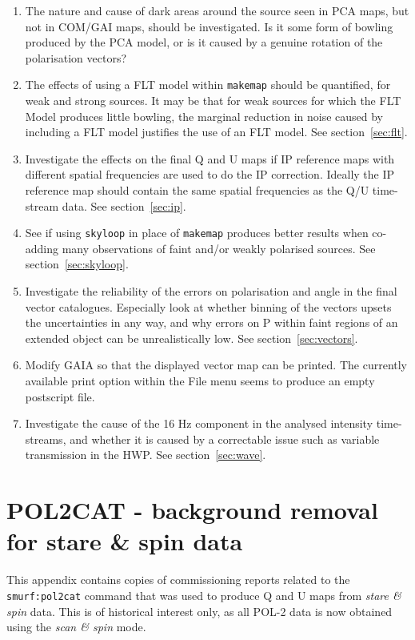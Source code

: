 \documentclass[twoside,11pt]{starlink}
\begin{document}
\begin{enumerate}
\item The nature and cause of dark areas around the source seen in PCA
maps, but not in COM/GAI maps, should be investigated. Is it some form of
bowling produced by the PCA model, or is it caused by a genuine rotation
of the polarisation vectors?

\item The effects of using a FLT model within \texttt{makemap} should be
quantified, for weak and strong sources. It may be that for weak sources
for which the FLT Model produces little bowling, the marginal reduction
in noise caused by including a FLT model justifies the use of an FLT model.
See section~\ref{sec:flt}.

\item Investigate the effects on the final Q and U maps if IP reference
maps with different spatial frequencies are used to do the IP correction.
Ideally the IP reference map should contain the same spatial frequencies
as the Q/U time-stream data. See section~\ref{sec:ip}.

\item See if using \texttt{skyloop} in place of \texttt{makemap} produces
better results when co-adding many observations of faint and/or weakly
polarised sources.  See section~\ref{sec:skyloop}.

\item Investigate the reliability of the errors on polarisation and angle
in the final vector catalogues. Especially look at whether binning of the
vectors upsets the uncertainties in any way, and why errors on P within faint
regions of an extended object can be unrealistically low. See
section~\ref{sec:vectors}.

\item Modify GAIA so that the displayed vector map can be printed. The
currently available print option within the File menu seems to produce an
empty postscript file.

\item Investigate the cause of the 16 Hz component in the analysed
intensity time-streams, and whether it is caused by a correctable issue
such as variable transmission in the HWP. See section~\ref{sec:wave}.

\end{enumerate}
\appendix

\section{POL2CAT - background removal for stare \& spin data}
\label{app:stare}
This appendix contains copies of commissioning reports related to the
\texttt{smurf:pol2cat} command that was used to produce Q and U maps from
\emph{stare \& spin} data. This is of historical interest only, as all POL-2
data is now obtained using the \emph{scan \& spin} mode.
\end{document}
